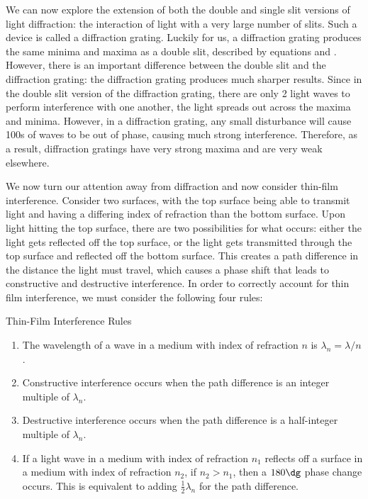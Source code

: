 \documentclass{article}
\begin{document}
\vspace{10px}
We can now explore the extension of both the double and single slit versions of light diffraction: the interaction of light with a very large number of slits. Such a device is called a diffraction grating. Luckily for us, a diffraction grating produces the same minima and maxima as a double slit, described by equations  and . However, there is an important difference between the double slit and the diffraction grating: the diffraction grating produces much sharper results. Since in the double slit version of the diffraction grating, there are only 2 light waves to perform interference with one another, the light spreads out across the maxima and minima. However, in a diffraction grating, any small disturbance will cause 100s of waves to be out of phase, causing much strong interference. Therefore, as a result, diffraction gratings have very strong maxima and are very weak elsewhere. 

\vspace*{20px}
We now turn our attention away from diffraction and now consider thin-film interference. Consider two surfaces, with the top surface being able to transmit light and having a differing index of refraction than the bottom surface. Upon light hitting the top surface, there are two possibilities for what occurs: either the light gets reflected off the top surface, or the light gets transmitted through the top surface and reflected off the bottom surface. This creates a path difference in the distance the light must travel, which causes a phase shift that leads to constructive and destructive interference. In order to correctly account for thin film interference, we must consider the following four rules:

\begin{thm}{Thin-Film Interference Rules}
    \begin{enumerate}
        \item The wavelength of a wave in a medium with index of refraction $n$ is $\lambda_n = \lambda / n$. 
        \item Constructive interference occurs when the path difference is an integer multiple of $\lambda_n$. 
        \item Destructive interference occurs when the path difference is a half-integer multiple of $\lambda_n$. 
        \item If a light wave in a medium with index of refraction $n_1$ reflects off a surface in a medium with index of refraction $n_2$, if $n_2 > n_1$, then a $180\dg$ phase change occurs. This is equivalent to adding $\frac{1}{2}\lambda_n$ for the path difference. 
    \end{enumerate}
\end{thm}
\end{document}
